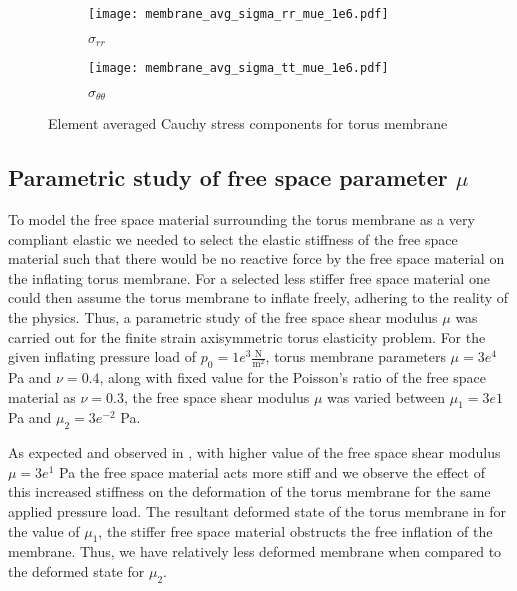 \begin{figure}[ht!]
\centering 
\begin{subfigure}[b]{0.49\textwidth}
\centering
\texttt{[image: membrane\_avg\_sigma\_rr\_mue\_1e6.pdf]}
\caption{$\sigma_{rr}$}
\label{fig:2.11.1}
\end{subfigure}
\begin{subfigure}[b]{0.49\textwidth}
\centering
\texttt{[image: membrane\_avg\_sigma\_tt\_mue\_1e6.pdf]}
\caption{$\sigma_{\theta \theta}$}
\label{fig:2.11.2}
\end{subfigure}
\caption{Element averaged Cauchy stress components for torus membrane}
\label{fig:2.11}
\end{figure} 

\subsection{Parametric study of free space parameter $\mu$}
To model the free space material surrounding the torus membrane as a very compliant elastic we needed to select the elastic stiffness of the free space material such that there would be no reactive force by the free space material on the inflating torus membrane. For a selected less stiffer free space material one could then assume the torus membrane to inflate freely, adhering to the reality of the physics. Thus, a parametric study of the free space shear modulus $\mu$ was carried out for the finite strain axisymmetric torus elasticity problem. For the given inflating pressure load of $p_0 = 1e^{3} \frac{\text{N}}{\text{m}^2}$, torus membrane parameters $\mu = 3e^4$ Pa and $\nu = 0.4$, along with fixed value for the Poisson's ratio of the free space material as $\nu = 0.3$, the free space shear modulus $\mu$ was varied between $\mu_1 = 3e1$ Pa and $\mu_2 = 3e^{-2}$ Pa. \par 

As expected and observed in , with higher value of the free space shear modulus $\mu = 3e^{1}$ Pa the free space material acts more stiff and we observe the effect of this increased stiffness on the deformation of the torus membrane for the same applied pressure load. The resultant deformed state of the torus membrane in  for the value of $\mu_1$, the stiffer free space material obstructs the free inflation of the membrane. Thus, we have relatively less deformed membrane when compared to the deformed state for $\mu_2$. \par 

